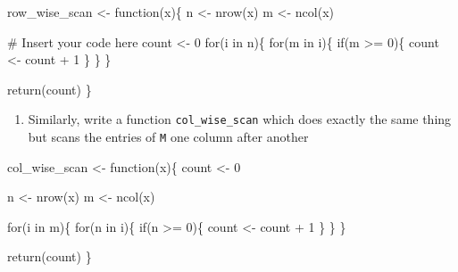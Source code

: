 \documentclass[
  letterpaper,
  DIV=11,
  numbers=noendperiod]{scrartcl}
\newenvironment{Shaded}{\begin{snugshade}}{\end{snugshade}}
\newcommand{\CommentTok}[1]{\textcolor[rgb]{0.37,0.37,0.37}{#1}}
\newcommand{\ControlFlowTok}[1]{\textcolor[rgb]{0.00,0.23,0.31}{#1}}
\newcommand{\DecValTok}[1]{\textcolor[rgb]{0.68,0.00,0.00}{#1}}
\newcommand{\FunctionTok}[1]{\textcolor[rgb]{0.28,0.35,0.67}{#1}}
\newcommand{\NormalTok}[1]{\textcolor[rgb]{0.00,0.23,0.31}{#1}}
\newcommand{\OtherTok}[1]{\textcolor[rgb]{0.00,0.23,0.31}{#1}}
\newcommand{\SpecialCharTok}[1]{\textcolor[rgb]{0.37,0.37,0.37}{#1}}
\providecommand{\tightlist}{%
  \setlength{\itemsep}{0pt}\setlength{\parskip}{0pt}}\usepackage{longtable,booktabs,array}
\begin{document}
\begin{Shaded}
\begin{Highlighting}[]
\NormalTok{row\_wise\_scan }\OtherTok{\textless{}{-}} \ControlFlowTok{function}\NormalTok{(x)\{}
\NormalTok{    n }\OtherTok{\textless{}{-}} \FunctionTok{nrow}\NormalTok{(x)}
\NormalTok{    m }\OtherTok{\textless{}{-}} \FunctionTok{ncol}\NormalTok{(x)}

    \CommentTok{\# Insert your code here}
\NormalTok{    count }\OtherTok{\textless{}{-}} \DecValTok{0}
    \ControlFlowTok{for}\NormalTok{(i }\ControlFlowTok{in}\NormalTok{ n)\{}
        \ControlFlowTok{for}\NormalTok{(m }\ControlFlowTok{in}\NormalTok{ i)\{}
            \ControlFlowTok{if}\NormalTok{(m }\SpecialCharTok{\textgreater{}=} \DecValTok{0}\NormalTok{)\{}
\NormalTok{                count }\OtherTok{\textless{}{-}}\NormalTok{ count }\SpecialCharTok{+} \DecValTok{1} 
\NormalTok{            \}}
\NormalTok{        \}}
\NormalTok{    \}}

    \FunctionTok{return}\NormalTok{(count)}
\NormalTok{  \}}
\end{Highlighting}
\end{Shaded}

\begin{enumerate}
\def\labelenumi{\arabic{enumi}.}
\setcounter{enumi}{2}
\tightlist
\item
  Similarly, write a function \texttt{col\_wise\_scan} which does
  exactly the same thing but scans the entries of \texttt{M} one column
  after another
\end{enumerate}

\begin{Shaded}
\begin{Highlighting}[]
\NormalTok{col\_wise\_scan }\OtherTok{\textless{}{-}} \ControlFlowTok{function}\NormalTok{(x)\{}
\NormalTok{    count }\OtherTok{\textless{}{-}} \DecValTok{0}
    
\NormalTok{    n }\OtherTok{\textless{}{-}} \FunctionTok{nrow}\NormalTok{(x)}
\NormalTok{    m }\OtherTok{\textless{}{-}} \FunctionTok{ncol}\NormalTok{(x)}

    \ControlFlowTok{for}\NormalTok{(i }\ControlFlowTok{in}\NormalTok{ m)\{}
        \ControlFlowTok{for}\NormalTok{(n }\ControlFlowTok{in}\NormalTok{ i)\{}
            \ControlFlowTok{if}\NormalTok{(n }\SpecialCharTok{\textgreater{}=} \DecValTok{0}\NormalTok{)\{}
\NormalTok{                count }\OtherTok{\textless{}{-}}\NormalTok{ count }\SpecialCharTok{+} \DecValTok{1} 
\NormalTok{            \}}
\NormalTok{        \}}
\NormalTok{    \}}

    \FunctionTok{return}\NormalTok{(count)}
\NormalTok{\}}
\end{Highlighting}
\end{Shaded}
\end{document}
